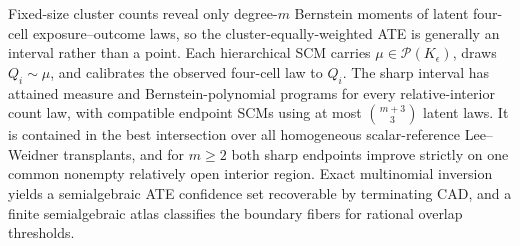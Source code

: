 Fixed-size cluster counts reveal only degree-\(m\) Bernstein moments of latent four-cell exposure--outcome laws, so the cluster-equally-weighted ATE is generally an interval rather than a point. Each hierarchical SCM carries \(\mu\in\mathcal P(K_{\epsilon})\), draws \(Q_i\sim\mu\), and calibrates the observed four-cell law to \(Q_i\). The sharp interval has attained measure and Bernstein-polynomial programs for every relative-interior count law, with compatible endpoint SCMs using at most \({m+3\choose3}\) latent laws. It is contained in the best intersection over all homogeneous scalar-reference Lee--Weidner transplants, and for \(m\geq2\) both sharp endpoints improve strictly on one common nonempty relatively open interior region. Exact multinomial inversion yields a semialgebraic ATE confidence set recoverable by terminating CAD, and a finite semialgebraic atlas classifies the boundary fibers for rational overlap thresholds.
